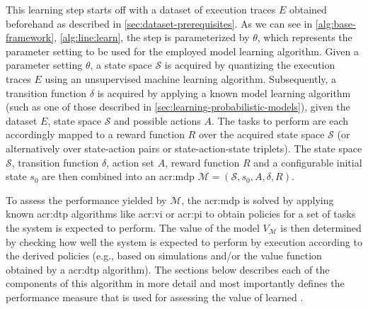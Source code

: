 This learning step starts off with a dataset of execution traces $E$ obtained beforehand as described in \autoref{sec:dataset-prerequisites}.
As we can see in \autoref{alg:base-framework}, \autoref{alg:line:learn}, the step is parameterized by $\theta$, which represents the parameter setting to be used for the employed model learning algorithm.
Given a parameter setting $\theta$, a state space $\mathcal{S}$ is acquired by quantizing the execution traces $E$ using an unsupervised machine learning algorithm.
Subsequently, a transition function $\delta$ is acquired by applying a known model learning algorithm (such as one of those described in \autoref{sec:learning-probabilistic-models}), given the dataset $E$, state space $\mathcal{S}$ and possible actions $A$.
The tasks to perform are each accordingly mapped to a reward function $R$ over the acquired state space $\mathcal{S}$ (or alternatively over state-action pairs or state-action-state triplets).
The state space $\mathcal{S}$, transition function $\delta$, action set $A$, reward function $R$ and a configurable initial state $s_0$ are then combined into an \acrshort{acr:mdp} $\mathcal{M} = (\mathcal{S}, s_0, A, \delta, R)$.

To assess the performance yielded by $\mathcal{M}$, the \acrshort{acr:mdp} is solved by applying known \acrshort{acr:dtp} algorithms like \acrshort{acr:vi} or \acrshort{acr:pi} to obtain policies for a set of tasks the system is expected to perform.
The value of the model $V_{\mathcal{M}}$ is then determined by checking how well the system is expected to perform by execution according to the derived policies (e.g., based on simulations and/or the value function obtained by a \acrshort{acr:dtp} algorithm).
The sections below describes each of the components of this algorithm in more detail and most importantly defines the performance measure that is used for assessing the value of learned .


